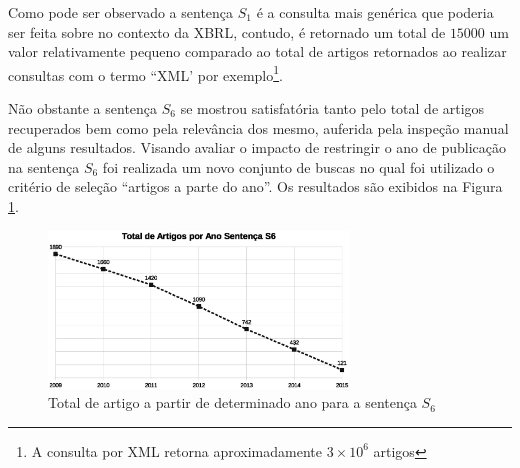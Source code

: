 \documentclass{article}
\begin{document}
\begin{table}[]
\centering
{}
\caption{Total de artigos por sentença}
\label{tab:sentencas}
\end{table}

Como pode ser observado a sentença $S_1$ é a consulta mais genérica que poderia ser feita sobre no contexto da XBRL, contudo, é retornado um total de $15000$ um valor relativamente pequeno comparado ao total de artigos retornados ao realizar consultas com o termo ``XML' por exemplo\footnote{A consulta por XML retorna aproximadamente $3 \times 10^{6}$ artigos}.

Não obstante a sentença $S_6$ se mostrou satisfatória tanto pelo total
de artigos recuperados bem como pela relevância dos mesmo, auferida
pela inspeção manual de alguns resultados. Visando avaliar o impacto
de restringir o ano de publicação na sentença $S_6$ foi realizada um
novo conjunto de buscas no qual foi utilizado o critério de seleção
``artigos a parte do ano''.  Os resultados são exibidos na Figura \ref{fig:graph_artigos_ano}{}.

\begin{figure}[h] 
\label{fig:graph_artigos_ano}
\includegraphics[width=8cm]{../img/graph_01.eps}
\caption{Total de artigo a partir de determinado ano para a sentença $S_6$}
\centering
\end{figure}
\end{document}
